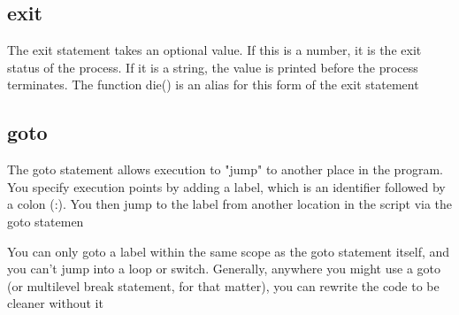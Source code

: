 \documentclass{report}
\begin{document}
\bigbreak \noindent 
\subsection{exit}
\bigbreak \noindent 
The exit statement takes an optional value. If this is a number, it is the exit status of
the process. If it is a string, the value is printed before the process terminates. The
function die() is an alias for this form of the exit statement

\bigbreak \noindent 
\subsection{goto}
\bigbreak \noindent 
The goto statement allows execution to "jump" to another place in the program. You specify execution points by adding a label, which is an identifier followed by a colon (:). You then jump to the label from another location in the script via the goto statemen
\bigbreak \noindent 
{}
\bigbreak \noindent 
You can only goto a label within the same scope as the goto statement itself, and you
can’t jump into a loop or switch. Generally, anywhere you might use a goto (or multilevel break statement, for that matter), you can rewrite the code to be cleaner without it

\bigbreak \noindent 
\end{document}
